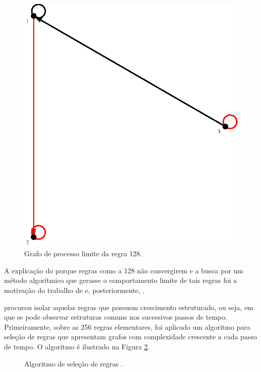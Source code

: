 \documentclass[12pt,a4paper]{article}
\begin{document}
\begin{figure}[htp]
\begin{center}
\includegraphics[scale=0.5]{img/limit128.eps}
\caption{Grafo de processo limite da regra 128.}
\label{fig:limit128}
\end{center}
\end{figure}

A explicação do porque regras como a 128 não convergirem e a busca por um
método algorítmico que gerasse o comportamento limite de tais regras foi
a motivação do trabalho de  e, posteriormente,
.

 procurou isolar aquelas regras
que possuem crescimento estruturado, ou seja, em que se pode observar
estruturas comuns nos sucessivos passos de tempo. Primeiramente, sobre as
256 regras elementares, foi aplicado um algoritmo para seleção de regras
que apresentam grafos com complexidade crescente a cada passo de tempo. O
algoritmo é ilustrado na Figura \ref{fig:rulesel}.

\begin{figure}[htp]
\begin{center}

\centerline{\box\graph}
\caption{Algoritmo de seleção de regras .}
\label{fig:rulesel}
\end{center}
\end{figure}
\end{document}
